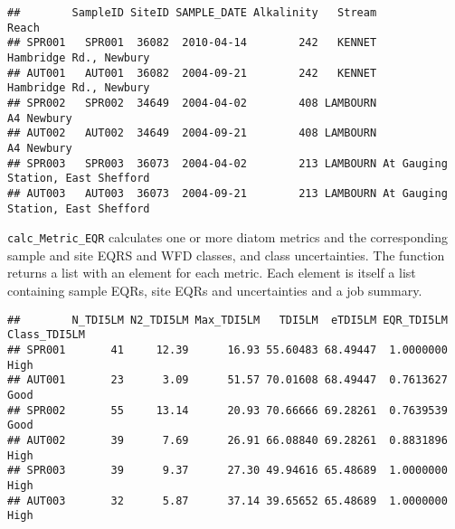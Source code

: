 \documentclass[]{article}
\newenvironment{Shaded}{\begin{snugshade}}{\end{snugshade}}
\newcommand{\KeywordTok}[1]{\textcolor[rgb]{0.13,0.29,0.53}{\textbf{#1}}}
\newcommand{\DataTypeTok}[1]{\textcolor[rgb]{0.13,0.29,0.53}{#1}}
\newcommand{\DecValTok}[1]{\textcolor[rgb]{0.00,0.00,0.81}{#1}}
\newcommand{\StringTok}[1]{\textcolor[rgb]{0.31,0.60,0.02}{#1}}
\newcommand{\OperatorTok}[1]{\textcolor[rgb]{0.81,0.36,0.00}{\textbf{#1}}}
\newcommand{\NormalTok}[1]{#1}
\begin{document}
\begin{verbatim}
##        SampleID SiteID SAMPLE_DATE Alkalinity   Stream                             Reach
## SPR001   SPR001  36082  2010-04-14        242   KENNET            Hambridge Rd., Newbury
## AUT001   AUT001  36082  2004-09-21        242   KENNET            Hambridge Rd., Newbury
## SPR002   SPR002  34649  2004-04-02        408 LAMBOURN                        A4 Newbury
## AUT002   AUT002  34649  2004-09-21        408 LAMBOURN                        A4 Newbury
## SPR003   SPR003  36073  2004-04-02        213 LAMBOURN At Gauging Station, East Shefford
## AUT003   AUT003  36073  2004-09-21        213 LAMBOURN At Gauging Station, East Shefford
\end{verbatim}

\texttt{calc\_Metric\_EQR} calculates one or more diatom metrics and the
corresponding sample and site EQRS and WFD classes, and class
uncertainties. The function returns a list with an element for each
metric. Each element is itself a list containing sample EQRs, site EQRs
and uncertainties and a job summary.

\begin{Shaded}
\end{Shaded}

\begin{verbatim}
##        N_TDI5LM N2_TDI5LM Max_TDI5LM   TDI5LM  eTDI5LM EQR_TDI5LM Class_TDI5LM
## SPR001       41     12.39      16.93 55.60483 68.49447  1.0000000         High
## AUT001       23      3.09      51.57 70.01608 68.49447  0.7613627         Good
## SPR002       55     13.14      20.93 70.66666 69.28261  0.7639539         Good
## AUT002       39      7.69      26.91 66.08840 69.28261  0.8831896         High
## SPR003       39      9.37      27.30 49.94616 65.48689  1.0000000         High
## AUT003       32      5.87      37.14 39.65652 65.48689  1.0000000         High
\end{verbatim}
\end{document}
